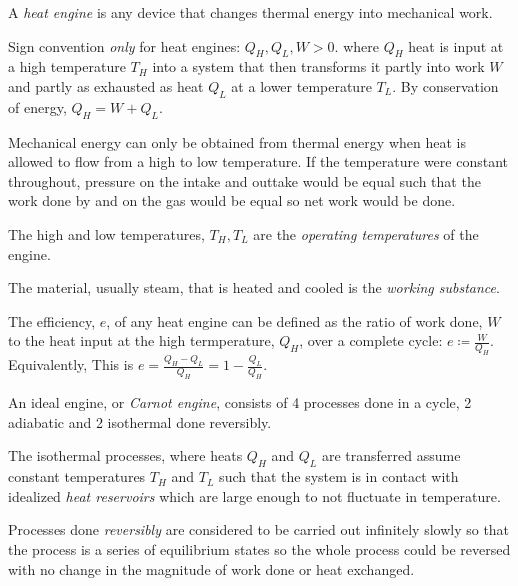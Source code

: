 \begin{definition}
    A \emph{heat engine} is any device that changes thermal energy into mechanical work. 
\end{definition}
\begin{note}
    Sign convention \emph{only} for heat engines: $Q_H, Q_L, W > 0.$ where $Q_H$ heat is input at a high temperature $T_H$ into a system that then transforms it partly into work $W$ and partly as exhausted as heat $Q_L$ at a lower temperature $T_L$. By conservation of energy, $Q_H = W + Q_L$.
\end{note}
\begin{remark}
    Mechanical energy can only be obtained from thermal energy when heat is allowed to flow from a high to low temperature. If the temperature were constant throughout, pressure on the intake and outtake would be equal such that the work done by and on the gas would be equal so net work would be done.
\end{remark}
\begin{definition}
    The high and low temperatures, $T_H, T_L$ are the \emph{operating temperatures} of the engine.
\end{definition}
\begin{definition}
    The material, usually steam, that is heated and cooled is the \emph{working substance}.
\end{definition}
\begin{definition}
    The efficiency, $e$, of any heat engine can be defined as the ratio of work done, $W$ to the heat input at the high termperature, $Q_H$, over a complete cycle: $e \coloneq \frac{W}{Q_H}$. Equivalently, This is $e = \frac{Q_H-Q_L}{Q_H} = 1 - \frac{Q_L}{Q_H}.$
\end{definition}
\begin{definition}
    An ideal engine, or \emph{Carnot engine}, consists of 4 processes done in a cycle, 2 adiabatic and 2 isothermal done reversibly.

    The isothermal processes, where heats $Q_H$ and $Q_L$ are transferred assume constant temperatures $T_H$ and $T_L$ such that the system is in contact with idealized \emph{heat reservoirs} which are large enough to not fluctuate in temperature.
\end{definition}
\begin{definition}
    Processes done \emph{reversibly} are considered to be carried out infinitely slowly so that the process is a series of equilibrium states so the whole process could be reversed with no change in the magnitude of work done or heat exchanged.
\end{definition}
